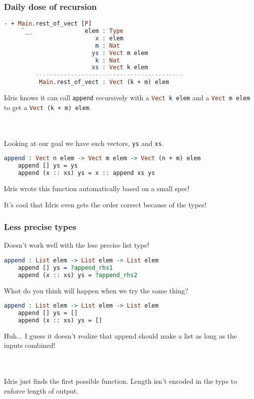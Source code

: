 \documentclass{beamer}
\begin{document}
\begin{frame}[fragile]
  \frametitle{Daily dose of recursion}

  \begin{lstlisting}[language=Idris]
    - + Main.rest_of_vect [P]
     `__               elem : Type
                          x : elem
                          m : Nat
                         ys : Vect m elem
                          k : Nat
                         xs : Vect k elem
         ------------------------------------------
          Main.rest_of_vect : Vect (k + m) elem
  \end{lstlisting}

  \pause
  Idris knows it can call \texttt{append} recursively with a
\lstinline[language=Idris,columns=fixed]{Vect k elem} and a
\lstinline[language=Idris,columns=fixed]{Vect m elem} to get a
\lstinline[language=Idris,columns=fixed]{Vect (k + m) elem}.

  \pause \\~\\

  Looking at our goal we have such vectors, \texttt{ys} and \texttt{xs}.

  \pause
  \begin{lstlisting}[language=Idris]
    append : Vect n elem -> Vect m elem -> Vect (n + m) elem
    append [] ys = ys
    append (x :: xs) ys = x :: append xs ys
  \end{lstlisting}

  \pause
  Idris wrote this function automatically based on a small spec!

  \pause
  It's cool that Idris even gets the order correct because of the types!
\end{frame}

\begin{frame}[fragile]
  \frametitle{Less precise types}

  Doesn't work well with the less precise list type!

  \pause
  \begin{lstlisting}[language=Idris]
    append : List elem -> List elem -> List elem
    append [] ys = ?append_rhs1
    append (x :: xs) ys = ?append_rhs2
  \end{lstlisting}

  What do you think will happen when we try the same thing?

  \pause
  \begin{lstlisting}[language=Idris]
    append : List elem -> List elem -> List elem
    append [] ys = []
    append (x :: xs) ys = []
  \end{lstlisting}

  Huh... I guess it doesn't realize that append should make a list as long as the inputs combined!

  \\~\\
  Idris just finds the first possible function. Length isn't encoded in the type to enforce length of output.
\end{frame}
\end{document}
